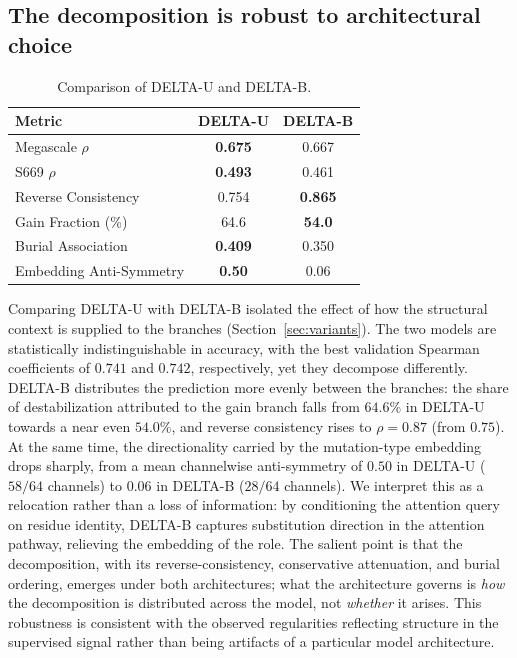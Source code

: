 \documentclass[11pt,a4paper]{article}
\theoremstyle{plain}
\theoremstyle{definition}
\begin{document}
\subsection{The decomposition is robust to architectural choice}
\label{sec:robust}
\begin{table}[h]
\centering
\caption{Comparison of DELTA-U and DELTA-B.}
\label{tab:deltablation}
\begin{tabular}{lcc}
\toprule
Metric & DELTA-U & DELTA-B \\
\midrule
Megascale $\rho$ & \textbf{0.675} & 0.667 \\
S669 $\rho$ & \textbf{0.493} & 0.461 \\
Reverse Consistency & 0.754 & \textbf{0.865} \\
Gain Fraction (\%) & 64.6 & \textbf{54.0} \\
Burial Association & \textbf{0.409} & 0.350 \\
Embedding Anti-Symmetry & \textbf{0.50} & 0.06 \\
\bottomrule
\end{tabular}
\end{table}
Comparing DELTA-U with DELTA-B isolated the effect of how the structural context is supplied to the branches (Section~\ref{sec:variants}). The two models are statistically indistinguishable in accuracy, with the best validation Spearman coefficients of $0.741$ and $0.742$, respectively, yet they decompose differently. DELTA-B distributes the prediction more evenly between the branches: the share of destabilization attributed to the gain branch falls from $64.6\%$ in DELTA-U towards a near even $54.0\%$, and reverse consistency rises to $\rho = 0.87$ (from $0.75$). At the same time, the directionality carried by the mutation-type embedding drops sharply, from a mean channelwise anti-symmetry of $0.50$ in DELTA-U ($58/64$ channels) to $0.06$ in DELTA-B ($28/64$ channels). We interpret this as a relocation rather than a loss of information: by conditioning the attention query on residue identity, DELTA-B captures substitution direction in the attention pathway, relieving the embedding of the role. The salient point is that the decomposition,
with its reverse-consistency, conservative attenuation, and burial ordering, emerges under both architectures; what the architecture governs is \emph{how} the decomposition is distributed across the model, not \emph{whether} it arises. This robustness is consistent with the observed regularities reflecting structure in the supervised signal rather than being artifacts of a particular model architecture.
\end{document}
